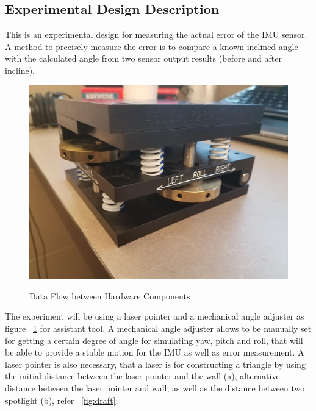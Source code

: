 \subsection{Experimental Design Description}
This is an experimental design for measuring the actual error of the IMU sensor. A method to precisely measure the error is to compare a known inclined angle with the calculated angle from two sensor output results (before and after incline). 

\begin{figure}
	\centering
 		\caption{Data Flow between Hardware Components}
      	\includegraphics[width=\textwidth,height=\textheight,keepaspectratio]{img/widget}
    \label{fig:widget}
\end{figure}

The experiment will be using a laser pointer and a mechanical angle adjuster as figure ~\ref{fig:widget} for assistant tool. A mechanical angle adjuster allows to be manually set for getting a certain degree of angle for simulating yaw, pitch and roll, that will be able to provide a stable motion for the IMU as well as error measurement. A laser pointer is also necessary, that a laser is for constructing a triangle by using the initial distance between the laser pointer and the wall (a), alternative distance between the laser pointer and wall, as well as the distance between two spotlight (b), refer ~\ref{fig:draft}:

